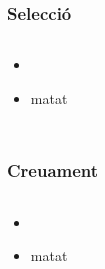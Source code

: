 \documentclass{beamer}
\begin{document}
\begin{frame}
	\frametitle{Selecció}
	\begin{columns}[c]
		\begin{itemize}
			\item 
				\pause
			\item matat
		\end{itemize}
	\end{columns}
\end{frame}

\begin{frame}
	\frametitle{Creuament}
	\begin{columns}[c]
		\begin{itemize}
			\item 
				\pause
			\item matat
		\end{itemize}
	\end{columns}
\end{frame}
\end{document}

